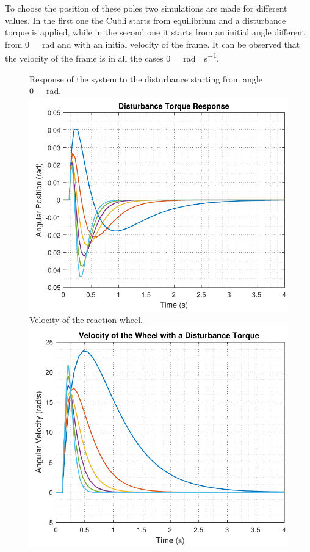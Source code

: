 To choose the position of these poles two simulations are made for different values. In the first one the Cubli starts from equilibrium and a disturbance torque is applied, while in the second one it starts from an initial angle different from \si{0\ rad} and with an initial velocity of the frame.  It can be observed that the velocity of the frame is in all the cases \si{0\ rad \cdot s^{-1}}.
\begin{figure}[H]
	\begin{minipage}{\linewidth}
		\captionsetup[subfigure]{font = footnotesize}
		\centering
		\subcaptionbox
		{
			Response of the system to the disturbance starting from angle \si{0\ rad}.
			\label{disturbanceStateSpace}
		}
		{
			\includegraphics[scale=.55]{figures/disturbanceStateSpace}
		}\quad
		\subcaptionbox
		{
			Velocity of the reaction wheel.
			\label{disturbanceStateSpaceWheel}
		}
		{
			\includegraphics[scale=.55]{figures/disturbanceStateSpaceWheel}
}
\end{minipage}
\end{figure}
